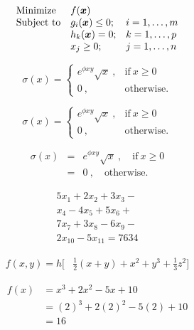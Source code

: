\documentclass[a4paper]{article}
\begin{document}
    \begin{equation*}
        \begin{array}{lll}
        \mbox{Minimize}
        & f(\mbox{\boldmath{$x$}}) &\\
        \mbox{Subject to}
        & g_i(\mbox{\boldmath{$x$}}) \leq 0 ; &
        i=1,\ldots,m\\
        & h_k(\mbox{\boldmath{$x$}}) = 0 ; &
        k=1,\ldots,p\\
        & x_j \geq 0 ; & j=1,\ldots,n
        \end{array}
    \end{equation*}
    
    
        \begin{equation}
    \sigma(x) = \begin{cases}
    e^{\phi xy} \sqrt{x}~,
    & \text{if} ~x\geq 0\\
    0~, & \text{otherwise.}
    \end{cases}
    \end{equation}

    \begin{equation}
        \sigma(x) = \left\{\begin{array}{rl}
        e^{\phi xy} \sqrt{x}~,
        & \text{if}~ x\geq 0\\
        0~, & \text{otherwise.}
        \end{array}\right.
    \end{equation}
    
    \begin{eqnarray}
        \sigma(x) &=& e^{\phi xy} \sqrt{x}~,\quad
        \text{if}~ x\geq 0\\
        &=& 0~,\quad \text{otherwise.}
    \end{eqnarray}




    \begin{multline}
    5x_1 + 2x_2 + 3x_3 -\\
    x_4 - 4x_5 + 5x_6 +\\
    7x_7 + 3x_8 - 6x_9 -\\
    2x_{10} - 5x_{11} = 7634
    \end{multline}
    
     \begin{equation}
    \begin{split}
    f(x,y)=h \biggl[ & \frac{1}{2}(x+y)+x^2+y^3
     +\frac{1}{3}z^2\biggr]
    \end{split}
    \end{equation}

    \begin{equation*}
    \begin{split}
    f(x) &= x^3 + 2x^2 - 5x + 10\\
    &= (2)^3 + 2(2)^2 - 5(2) + 10\\
    &= 16
    \end{split}
    \end{equation*}
\end{document}
